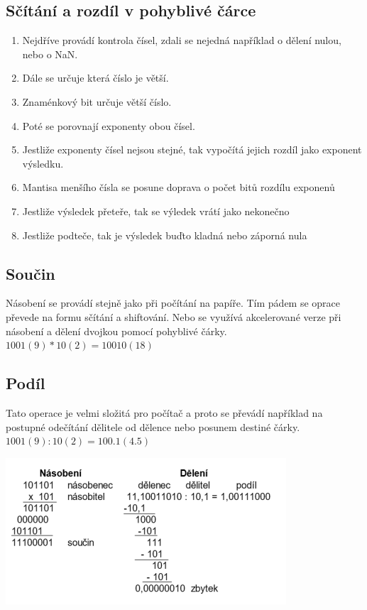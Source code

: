 \subsection{Sčítání a rozdíl v pohyblivé čárce}
\begin{enumerate}
  \item Nejdříve provádí kontrola čísel, zdali se nejedná například o dělení nulou, nebo o NaN.
  \item Dále se určuje která číslo je větší.
  \item Znaménkový bit určuje větší číslo.
  \item Poté se porovnají exponenty obou čísel.
  \item Jestliže exponenty čísel nejsou stejné, tak vypočítá jejich rozdíl jako exponent výsledku.
  \item Mantisa menšího čísla se posune doprava o počet bitů rozdílu exponenů
  \item Jestliže výsledek přeteře, tak se výledek vrátí jako nekonečno
  \item Jestliže podteče, tak je výsledek buďto kladná nebo záporná nula
\end{enumerate}

\subsection{Součin}
Násobení se provádí stejně jako při počítání na papíře.
Tím pádem se oprace převede na formu sčítání a shiftování.
Nebo se využívá akcelerované verze při násobení a dělení dvojkou pomocí pohyblivé čárky.
$1001 (9) * 10 (2) = 10010 (18)$
\subsection{Podíl}
Tato operace je velmi složitá pro počítač a proto se převádí například na postupné odečítání dělitele od dělence nebo posunem destiné čárky.
$1001 (9) : 10 (2) = 100.1 (4.5)$
\begin{center}
  \includegraphics[width=0.5\linewidth]{TVY-POS/Aritmeticke-operace/nasobeni-deleni.png}
\end{center}
